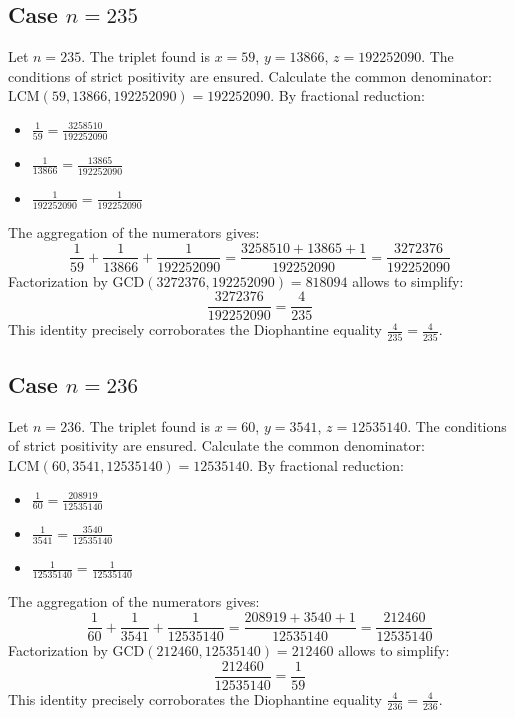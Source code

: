 \documentclass[11pt,a4paper]{article}
\begin{document}
\subsection{Case $n = 235$}
Let $n = 235$. The triplet found is $x = 59$, $y = 13866$, $z = 192252090$.
The conditions of strict positivity are ensured.
Calculate the common denominator: $\text{LCM}(59, 13866, 192252090) = 192252090$.
By fractional reduction:
\begin{itemize}
    \item $\frac{1}{59} = \frac{3258510}{192252090}$
    \item $\frac{1}{13866} = \frac{13865}{192252090}$
    \item $\frac{1}{192252090} = \frac{1}{192252090}$
\end{itemize}
The aggregation of the numerators gives:
$$ \frac{1}{59} + \frac{1}{13866} + \frac{1}{192252090} = \frac{3258510 + 13865 + 1}{192252090} = \frac{3272376}{192252090} $$
Factorization by $\text{GCD}(3272376, 192252090) = 818094$ allows to simplify:
$$ \frac{3272376}{192252090} = \frac{4}{235} $$
This identity precisely corroborates the Diophantine equality $\frac{4}{235} = \frac{4}{235}$.

\subsection{Case $n = 236$}
Let $n = 236$. The triplet found is $x = 60$, $y = 3541$, $z = 12535140$.
The conditions of strict positivity are ensured.
Calculate the common denominator: $\text{LCM}(60, 3541, 12535140) = 12535140$.
By fractional reduction:
\begin{itemize}
    \item $\frac{1}{60} = \frac{208919}{12535140}$
    \item $\frac{1}{3541} = \frac{3540}{12535140}$
    \item $\frac{1}{12535140} = \frac{1}{12535140}$
\end{itemize}
The aggregation of the numerators gives:
$$ \frac{1}{60} + \frac{1}{3541} + \frac{1}{12535140} = \frac{208919 + 3540 + 1}{12535140} = \frac{212460}{12535140} $$
Factorization by $\text{GCD}(212460, 12535140) = 212460$ allows to simplify:
$$ \frac{212460}{12535140} = \frac{1}{59} $$
This identity precisely corroborates the Diophantine equality $\frac{4}{236} = \frac{4}{236}$.
\end{document}
